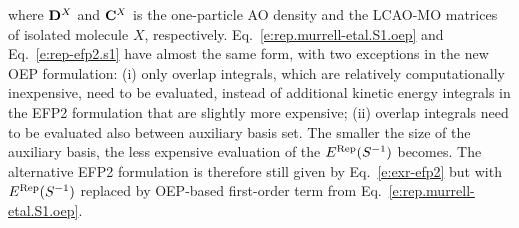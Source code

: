 %
where ${\bf D}^X$ and ${\bf C}^X$ is the one\hyp{}particle AO density and
the LCAO\hyp{}MO matrices of isolated molecule $X$, respectively.
%
Eq.~\eqref{e:rep.murrell-etal.S1.oep} and Eq.~\eqref{e:rep-efp2.s1} have almost
the same form, with two exceptions in the new OEP formulation: 
(i) only overlap integrals, which are relatively computationally inexpensive,
need to be evaluated, instead of additional kinetic energy integrals in the EFP2
formulation that are slightly more expensive;
(ii) overlap integrals need to be evaluated also between
auxiliary basis set. The smaller the size of the auxiliary basis, the less expensive
evaluation of the $E^{\rm Rep}(S^{-1})$ becomes. 
The alternative EFP2 formulation %
is therefore still given by Eq.~\eqref{e:exr-efp2}
%
%
but with $E^{\rm Rep}(S^{-1})$ replaced by OEP\hyp{}based
first\hyp{}order term from Eq.~\eqref{e:rep.murrell-etal.S1.oep}.

